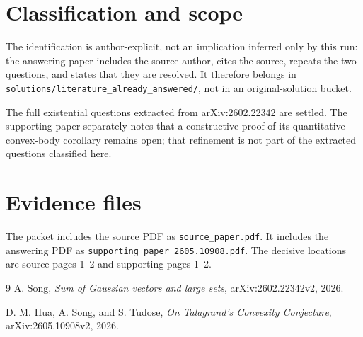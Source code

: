 \documentclass[11pt]{article}
\begin{document}
\section*{Classification and scope}

The identification is author-explicit, not an implication inferred only by
this run: the answering paper includes the source author, cites the source,
repeats the two questions, and states that they are resolved.  It therefore
belongs in \texttt{solutions/literature\_already\_answered/}, not in an
original-solution bucket.

The full existential questions extracted from arXiv:2602.22342 are settled.
The supporting paper separately notes that a constructive proof of its
quantitative convex-body corollary remains open; that refinement is not part of
the extracted questions classified here.

\section*{Evidence files}

The packet includes the source PDF as \texttt{source\_paper.pdf}.  It includes
the answering PDF as \texttt{supporting\_paper\_2605.10908.pdf}.  The decisive
locations are source pages 1--2 and supporting pages 1--2.

\begin{thebibliography}{9}
A. Song,
\emph{Sum of Gaussian vectors and large sets},
arXiv:2602.22342v2, 2026.

D. M. Hua, A. Song, and S. Tudose,
\emph{On Talagrand's Convexity Conjecture},
arXiv:2605.10908v2, 2026.
\end{thebibliography}
\end{document}
